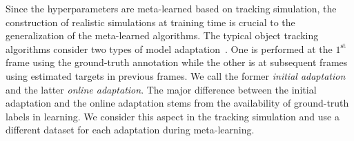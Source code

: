 \documentclass[letterpaper]{article} %
\begin{document}
%

Since the hyperparameters are meta-learned based on tracking simulation, the construction of realistic simulations at training time is crucial to the generalization of the meta-learned algorithms.
The typical object tracking algorithms consider two types of model adaptation~\cite{nam2016learningmulti,jung2018realtime}.
One is performed at the $1^\mathrm{st}$ frame using the ground-truth annotation while the other is at subsequent frames using estimated targets in previous frames.
We call the former {\em initial adaptation} and the latter {\em online adaptation}. The major difference between the initial adaptation and the online adaptation stems from the availability of ground-truth labels in learning. 
We consider this aspect in the tracking simulation and use a different dataset for each adaptation during meta-learning.
\end{document}
